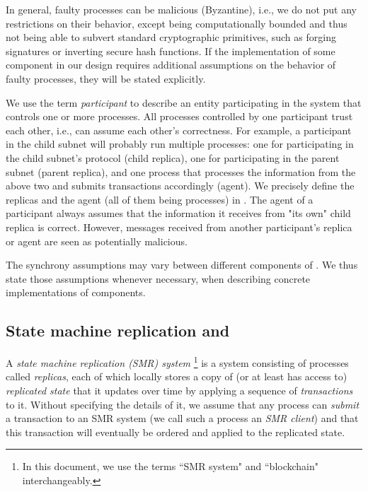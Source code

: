 In general, faulty processes can be malicious (Byzantine), i.e., we do not put any restrictions on their behavior, except being computationally bounded and thus not being able to subvert standard cryptographic primitives, such as forging signatures or inverting secure hash functions.
If the implementation of some component in our design requires additional assumptions on the behavior of faulty processes, they will be stated explicitly.

We use the term \emph{participant} to describe an entity participating in the system that controls one or more processes.
All processes controlled by one participant trust each other, i.e., can assume each other's correctness.
For example, a participant in the child subnet will probably run multiple processes:
one for participating in the child subnet's protocol (child replica),
one for participating in the parent subnet (parent replica),
and one process that processes the information from the above two and submits transactions accordingly (\ipc agent).
We precisely define the replicas and the \ipc agent (all of them being processes) in .
The \ipc agent of a participant always assumes that the information it receives from "its own" child replica is correct.
However, messages received from another participant's replica or \ipc agent are seen as potentially malicious.

The synchrony assumptions may vary between different components of \ipc.
We thus state those assumptions whenever necessary, when describing concrete implementations of \ipc components.

\subsection{State machine replication and \dapps}
\label{sec:smr}

A \emph{state machine replication (SMR) system}%
\footnote{In this document, we use the terms ``SMR system" and ``blockchain" interchangeably.}
is a system consisting of processes called \emph{replicas}, each of which locally stores a copy of (or at least has access to) \emph{replicated state}
that it updates over time by applying a sequence of \emph{transactions} to it.
Without specifying the details of it, we assume that any process can \emph{submit} a transaction to an SMR system (we call such a process an \emph{SMR client})
and that this transaction will eventually be ordered and applied to the replicated state.

